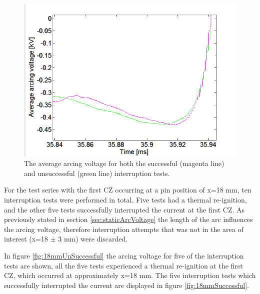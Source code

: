 \documentclass[10pt,b5paper,twoside]{article}
\begin{document}
\begin{figure}[H]
\centering
\includegraphics[scale=0.6, angle =0 ]{Bilder/Results/ArcingVoltage_75_both_average.PNG}
\caption{The average arcing voltage for both the successful (magenta line) and unsuccessful (green line) interruption tests.} \label{fig:75mm_both_ave}
\end{figure}

For the test series with the first CZ occurring at a pin position of x=18 mm, ten interruption tests were performed in total. Five tests had a thermal re-ignition, and the other five tests successfully interrupted the current at the first CZ. As previously stated in section \ref{sec:staticArcVoltage} the length of the arc influences the arcing voltage, therefore interruption attempts that was not in the area of interest (x=18 $\pm$ 3 mm) were discarded.

In figure \ref{fig:18mmUnSuccessful} the arcing voltage for five of the interruption tests are shown, all the five tests experienced a thermal re-ignition at the first CZ, which occurred at approximately x=18 mm. The five interruption tests which successfully interrupted the current are displayed in figure \ref{fig:18mmSuccessful}.
\end{document}
